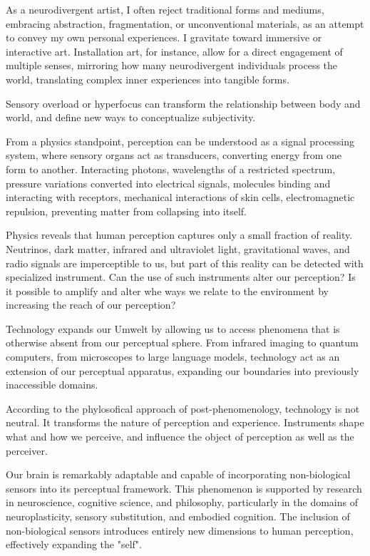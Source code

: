As a neurodivergent artist, I often reject traditional forms and mediums, embracing abstraction, fragmentation, or unconventional materials, as an attempt to convey my own personal experiences. I gravitate toward immersive or interactive art. Installation art, for instance, allow for a direct engagement of multiple senses, mirroring how many neurodivergent individuals process the world, translating complex inner experiences into tangible forms.

Sensory overload or hyperfocus can transform the relationship between body and world, and define new ways to conceptualize subjectivity.

From a physics standpoint, perception can be understood as a signal processing system, where sensory organs act as transducers, converting energy from one form to another. Interacting photons, wavelengths of a restricted spectrum, pressure variations converted into electrical signals, molecules binding and interacting with receptors, mechanical interactions of skin cells, electromagnetic repulsion, preventing matter from collapsing into itself. 

Physics reveals that human perception captures only a small fraction of reality. Neutrinos, dark matter, infrared and ultraviolet light, gravitational waves, and radio signals are imperceptible to us, but part of this reality can be detected with specialized instrument. Can the use of such instruments alter our perception? Is it possible to amplify and alter whe ways we relate to the environment by increasing the reach of our perception? 

Technology expands our Umwelt by allowing us to access phenomena that is otherwise absent from our perceptual sphere. From infrared imaging to quantum computers, from microscopes to large language models, technology act as an extension of our perceptual apparatus, expanding our boundaries into previously inaccessible domains.  

According to the phylosofical approach of post-phenomenology, technology is not neutral. It transforms the nature of perception and experience. Instruments shape what and how we perceive, and influence the object of perception as well as the perceiver.

Our brain is remarkably adaptable and capable of incorporating non-biological sensors into its perceptual framework. This phenomenon is supported by research in neuroscience, cognitive science, and philosophy, particularly in the domains of neuroplasticity, sensory substitution, and embodied cognition. The inclusion of non-biological sensors introduces entirely new dimensions to human perception, effectively expanding the "self".

